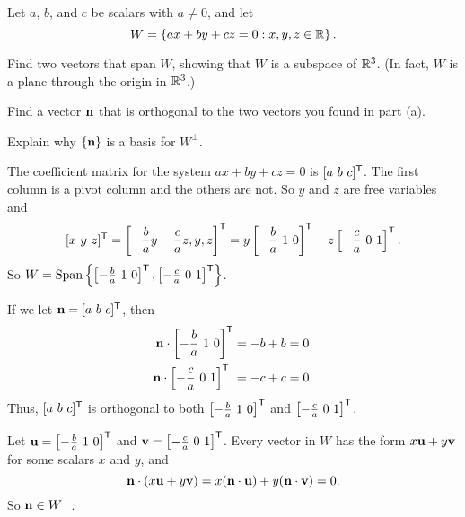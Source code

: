 \begin{example} Let $a$, $b$, and $c$ be scalars with $a \neq 0$, and let 
\[W = \{ax+by+cz=0 : x,y,z \in \mathbb{R}\} \, .\]  
\ba
\item Find two vectors that span $W$, showing that $W$ is a subspace of $\mathbb{R}^3$. (In fact, $W$ is a plane through the origin in $\mathbb{R}^3$.)

\item Find a vector $\mathbf{n}$ that is orthogonal to the two vectors you found in part (a). 

\item Explain why $\{\mathbf{n}\}$ is a basis for $W^{\perp}$. 

\ea

\ExampleSolution
\ba
\item The coefficient matrix for the system $ax+by+cz = 0$ is $[a \ b \ c]^{\tr}$. The first column is a pivot column and the others are not. So $y$ and $z$ are free variables and 
\[[x \ y \ z]^{\tr} = \left[-\frac{b}{a}y - \frac{c}{a}z, y, z\right]^{\tr} = y\left[ -\frac{b}{a} \ 1 \ 0\right]^{\tr} + z\left[ -\frac{c}{a} \ 0 \ 1\right]^{\tr}.\]
So $W = \text{Span}\left\{\left[ -\frac{b}{a} \ 1 \ 0\right]^{\mathsf{T}}, \left[ -\frac{c}{a} \ 0 \ 1\right]^{\mathsf{T}}\right\}$.  

\item If we let $\mathbf{n} = [a \ b \ c]^{\mathsf{T}}$, then 
\begin{align*}
\mathbf{n} \cdot \left[ -\frac{b}{a} \ 1 \ 0\right]^{\mathsf{T}} &= -b+b = 0 \\
\mathbf{n} \cdot \left[ -\frac{c}{a} \ 0 \ 1\right]^{\mathsf{T}}\ &= -c+c = 0.
\end{align*}
Thus, $[a \ b \ c]^{\tr}$ is orthogonal to both $\left[ -\frac{b}{a} \ 1 \ 0\right]^{\mathsf{T}}$ and $\left[ -\frac{c}{a} \ 0 \ 1\right]^{\tr}$. 

\item Let $\vu = \left[ -\frac{b}{a} \ 1 \ 0\right]^{\tr}$ and $\mathbf{v} = \left[ -\frac{c}{a} \ 0 \ 1\right]^{\mathsf{T}}$. Every vector in $W$ has the form $x\mathbf{u} + y\mathbf{v}$ for some scalars $x$ and $y$, and 
\[\mathbf{n} \cdot (x\mathbf{u} + y\mathbf{v}) = x(\mathbf{n} \cdot \mathbf{u}) + y (\mathbf{n} \cdot \mathbf{v}) = 0.\]
So $\mathbf{n} \in W^{\perp}$. 


\end{example}
